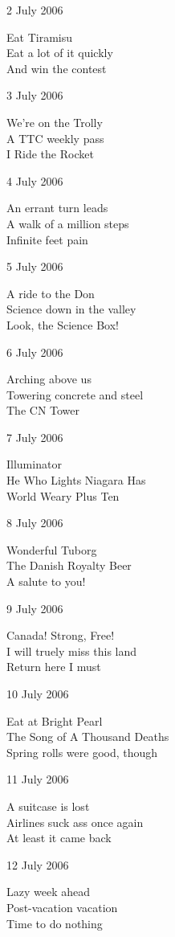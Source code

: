 \documentclass[12pt]{article}
\begin{document}
\newpage

2 July 2006

Eat Tiramisu \\
Eat a lot of it quickly \\
And win the contest

3 July 2006

We're on the Trolly \\
A TTC weekly pass \\
I Ride the Rocket

4 July 2006

An errant turn leads \\
A walk of a million steps \\
Infinite feet pain

5 July 2006

A ride to the Don \\
Science down in the valley \\
Look, the Science Box!

6 July 2006

Arching above us \\
Towering concrete and steel \\
The CN Tower

7 July 2006

Illuminator \\
He Who Lights Niagara Has \\
World Weary Plus Ten

\newpage

8 July 2006

Wonderful Tuborg \\
The Danish Royalty Beer \\
A salute to you!

9 July 2006

Canada! Strong, Free! \\
I will truely miss this land \\
Return here I must

10 July 2006

Eat at Bright Pearl \\
The Song of A Thousand Deaths \\
Spring rolls were good, though

11 July 2006

A suitcase is lost \\
Airlines suck ass once again \\
At least it came back

12 July 2006

Lazy week ahead \\
Post-vacation vacation \\
Time to do nothing
\end{document}
